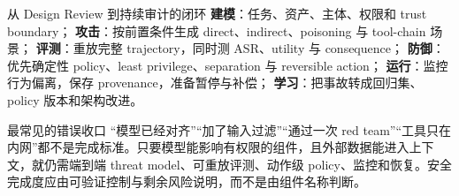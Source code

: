 \begin{importantbox}{从 Design Review 到持续审计的闭环}
\textbf{建模}：任务、资产、主体、权限和 trust boundary；
\textbf{攻击}：按前置条件生成 direct、indirect、poisoning 与 tool-chain 场景；
\textbf{评测}：重放完整 trajectory，同时测 ASR、utility 与 consequence；
\textbf{防御}：优先确定性 policy、least privilege、separation 与 reversible action；
\textbf{运行}：监控行为偏离，保存 provenance，准备暂停与补偿；
\textbf{学习}：把事故转成回归集、policy 版本和架构改进。
\end{importantbox}

\begin{warningbox}{最常见的错误收口}
“模型已经对齐”“加了输入过滤”“通过一次 red team”“工具只在内网”都不是完成标准。只要模型能影响有权限的组件，且外部数据能进入上下文，就仍需端到端 threat model、可重放评测、动作级 policy、监控和恢复。安全完成度应由可验证控制与剩余风险说明，而不是由组件名称判断。
\end{warningbox}

